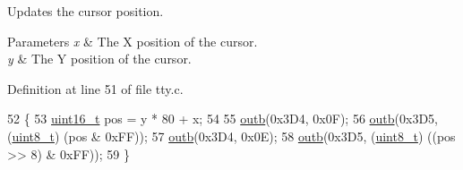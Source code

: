 Updates the cursor position. 


\begin{DoxyParams}{Parameters}
{\em x} & The X position of the cursor. \\
\hline
{\em y} & The Y position of the cursor. \\
\hline
\end{DoxyParams}


Definition at line 51 of file tty.\+c.


\begin{DoxyCode}
52 \{
53     \hyperlink{a00134_a273cf69d639a59973b6019625df33e30_a273cf69d639a59973b6019625df33e30}{uint16\_t} pos = y * 80 + x;
54  
55     \hyperlink{a00158_aa37f5841c54156a4b14fc0d6f626b44f_aa37f5841c54156a4b14fc0d6f626b44f}{outb}(0x3D4, 0x0F);
56     \hyperlink{a00158_aa37f5841c54156a4b14fc0d6f626b44f_aa37f5841c54156a4b14fc0d6f626b44f}{outb}(0x3D5, (\hyperlink{a00134_aba7bc1797add20fe3efdf37ced1182c5_aba7bc1797add20fe3efdf37ced1182c5}{uint8\_t}) (pos & 0xFF));
57     \hyperlink{a00158_aa37f5841c54156a4b14fc0d6f626b44f_aa37f5841c54156a4b14fc0d6f626b44f}{outb}(0x3D4, 0x0E);
58     \hyperlink{a00158_aa37f5841c54156a4b14fc0d6f626b44f_aa37f5841c54156a4b14fc0d6f626b44f}{outb}(0x3D5, (\hyperlink{a00134_aba7bc1797add20fe3efdf37ced1182c5_aba7bc1797add20fe3efdf37ced1182c5}{uint8\_t}) ((pos >> 8) & 0xFF));
59 \}
\end{DoxyCode}
